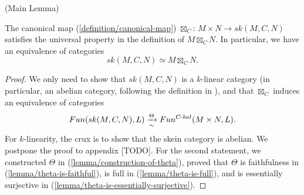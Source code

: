 \begin{lemma} (Main Lemma) \label{lemma/main-lemma}

  \noindent The canonical map (\ref{definition/canonical-map})
  $\boxtimes_{C}$: $M \times N \to sk(M,C,N)$ satisfies the universal property
  in the definition of $M \boxtimes_{C} N$. In particular, we have an
  equivalence of categories
  \[
    sk(M,C,N) \simeq M \boxtimes_{C} N.
  \]
\end{lemma}


\begin{proof}
  We only need to show that $sk(M,C,N)$ is a $k$-linear category (in
  particular, an abelian category, following the definition in
  \cite{douglas/balanced-product}), and that $\boxtimes_{C}$ induces an equivalence of
  categories
  \[
    Fun(sk(M,C,N), L) \xrightarrow[\sim]{\Theta} Fun^{C{\text -}bal}(M \times N, L).
  \]
  For $k$-linearity, the crux is to show that the skein category is abelian.
  We postpone the proof to appendix [TODO]. For the second statement, we
  constructed $\Theta$ in (\ref{lemma/construction-of-theta}), proved that $\Theta$ is faithfulness in (\ref{lemma/theta-is-faithful}), is full
  in (\ref{lemma/theta-is-full}), and is essentially surjective in (\ref{lemma/theta-is-essentially-surjective}).
\end{proof}


